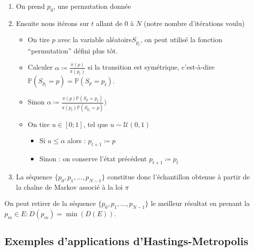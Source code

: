 \documentclass{article}
\begin{document}
\begin{tcolorbox}[colback=white,colframe={rgb,255:red,150; green,56; blue,235},title=Procédure Hastings-Metropolis TSP, breakable]
\begin{enumerate}
    \item On prend $p_0$, une permutation donnée
    \item Ensuite nous itérons sur $t$ allant de 0 à $N$ (notre nombre d'itérations voulu)
    \begin{itemize}
        \item On tire $p$ avec la variable aléatoire$S_{p_t}$, on peut utilisé la fonction ``permutation'' défini plus tôt.
        \item Calculer $\alpha \coloneqq \frac{\pi(p)}{\pi(p_t)}$ si la transition est symétrique, c'est-à-dire $\mathbb{P}(S_{p_t} = p) = \mathbb{P}(S_p = p_t)$.
        \item Sinon $\alpha \coloneqq \frac{\pi(p) \mathbb{P}(S_p = p_t)}{\pi(p_t) \mathbb{P}(S_{p_t} = p) } ) $ 

        \item On tire $u \in [0;1]$, tel que $u  \sim \mathcal{U}(0,1)$ 
        \begin{itemize}
            \item Si $u \leqslant \alpha$ alors : $p_{t+1} \coloneqq p$  
            \item Sinon : on conserve l'état précédent $p_{t+1} \coloneqq p_t$  
        \end{itemize}
    \end{itemize}
    \item La séquence $\{p_0,p_1, \ldots ,p_{N-1}\}$ constitue donc l'échantillon obtenue à partir de la chaîne de Markov associé à la loi $\pi$
\end{enumerate}

On peut retirer de la séquence $\{p_0,p_1, \ldots ,p_{N-1}\}$ le meilleur résultat en prenant la $p_{m} \in E : D(p_{m}) = \min(D(E))$.
\end{tcolorbox}

\newpage
\subsection{Exemples d'applications d'Hastings-Metropolis}
\end{document}
